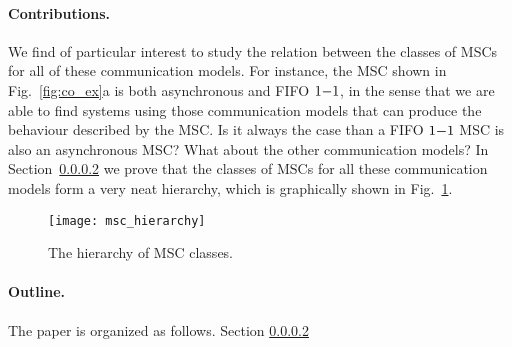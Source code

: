 \paragraph{Contributions.} 

We find of particular interest to study the relation between the classes of MSCs for all of these communication models. For instance, the MSC shown in Fig.~\ref{fig:co_ex}a is both asynchronous and FIFO $1\mathsf{-}1$, in the sense that we are able to find systems using those communication models that can produce the behaviour described by the MSC. Is it always the case than a FIFO $1\mathsf{-}1$ MSC is also an asynchronous MSC? What about the other communication models? In Section~\ref{} we prove that the classes of MSCs for all these communication models form a very neat hierarchy, which is graphically shown in Fig.~\ref{fig:msc_hierarchy_full}.

\begin{figure}[h]
	\centering
	\texttt{[image: msc\_hierarchy]}
	\caption{The hierarchy of MSC classes.}
	\label{fig:msc_hierarchy_full}
\end{figure}



\paragraph{Outline.} The paper is organized as follows. Section \ref{}

